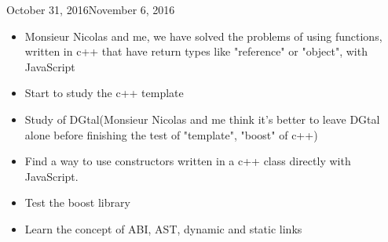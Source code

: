 \begin{fichesuivi}{October 31, 2016}{November 6, 2016}

   \begin{travaileffectue}
       \begin{itemize}
           \item Monsieur Nicolas and me, we have solved the problems of using functions, written in c++ that have return types like "reference" or "object", with JavaScript
           \item Start to study the c++ template
       \end{itemize}
   \end{travaileffectue}

   \begin{travailnoneffectue}
        \begin{itemize}
             \item Study of DGtal(Monsieur Nicolas and me think it's better to leave DGtal alone before finishing the test of "template", "boost" of c++)
       \end{itemize}
   \end{travailnoneffectue}

   \begin{planification}
        \begin{itemize}
            \item Find a way to use constructors written in a c++ class directly with JavaScript.
            \item Test the boost library
            \item Learn the concept of ABI, AST, dynamic and static links
        \end{itemize}
   \end{planification}
\end{fichesuivi}




